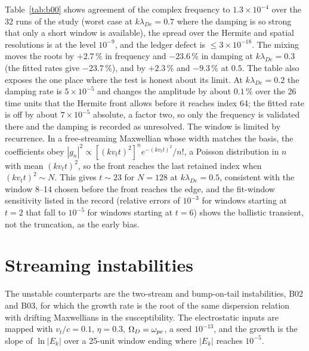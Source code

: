 Table~\ref{tab:b00} shows agreement of the complex frequency to $1.3\times10^{-4}$ over the 32 runs of the study (worst case at $k\lambda_{De}=0.7$ where the damping is so strong that only a short window is available), the spread over the Hermite and spatial resolutions is at the level $10^{-9}$, and the ledger defect is $\le3\times10^{-18}$. The mixing moves the roots by $+2.7\,\%$ in frequency and $-23.6\,\%$ in damping at $k\lambda_{De}=0.3$ (the fitted rates give $-23.7\,\%$), and by $+2.3\,\%$ and $-9.3\,\%$ at $0.5$. The table also exposes the one place where the test is honest about its limit. At $k\lambda_{De}=0.2$ the damping rate is $5\times10^{-5}$ and changes the amplitude by about $0.1\,\%$ over the 26 time units that the Hermite front allows before it reaches index 64; the fitted rate is off by about $7\times10^{-5}$ absolute, a factor two, so only the frequency is validated there and the damping is recorded as unresolved. The window is limited by recurrence. In a free-streaming Maxwellian whose width matches the basis, the coefficients obey $|g_n|^2\propto[(kv_tt)^2]^ne^{-(kv_tt)^2}/n!$, a Poisson distribution in $n$ with mean $(kv_tt)^2$, so the front reaches the last retained index when $(kv_tt)^2\sim N$. This gives $t\sim23$ for $N=128$ at $k\lambda_{De}=0.5$, consistent with the window 8--14 chosen before the front reaches the edge, and the fit-window sensitivity listed in the record (relative errors of $10^{-3}$ for windows starting at $t=2$ that fall to $10^{-5}$ for windows starting at $t=6$) shows the ballistic transient, not the truncation, as the early bias.

\section{Streaming instabilities}\label{sec:streaming-inst}

The unstable counterparts are the two-stream and bump-on-tail instabilities, B02 and B03, for which the growth rate is the root of the same dispersion relation with drifting Maxwellians in the susceptibility. The electrostatic inputs are mapped with $v_t/c=0.1$, $\eta=0.3$, $\Omega_D=\omega_{pe}$, a seed $10^{-13}$, and the growth is the slope of $\ln|E_k|$ over a 25-unit window ending where $|E_k|$ reaches $10^{-5}$.


